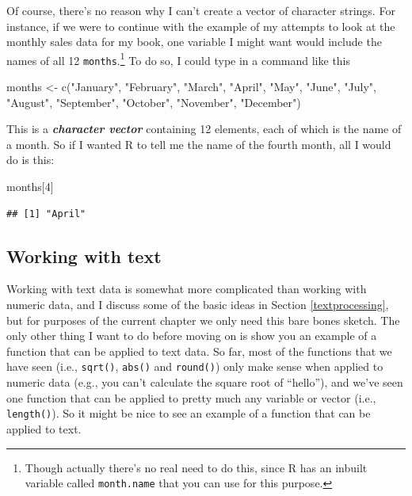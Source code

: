 \documentclass[
]{book}
\newenvironment{Shaded}{\begin{snugshade}}{\end{snugshade}}
\newcommand{\DecValTok}[1]{\textcolor[rgb]{0.00,0.00,0.81}{#1}}
\newcommand{\FunctionTok}[1]{\textcolor[rgb]{0.00,0.00,0.00}{#1}}
\newcommand{\NormalTok}[1]{#1}
\newcommand{\OtherTok}[1]{\textcolor[rgb]{0.56,0.35,0.01}{#1}}
\newcommand{\StringTok}[1]{\textcolor[rgb]{0.31,0.60,0.02}{#1}}
\begin{document}
Of course, there's no reason why I can't create a vector of character strings. For instance, if we were to continue with the example of my attempts to look at the monthly sales data for my book, one variable I might want would include the names of all 12 \texttt{months}.\footnote{Though actually there's no real need to do this, since R has an inbuilt variable called \texttt{month.name} that you can use for this purpose.} To do so, I could type in a command like this

\begin{Shaded}
\begin{Highlighting}[]
\NormalTok{months }\OtherTok{\textless{}{-}} \FunctionTok{c}\NormalTok{(}\StringTok{"January"}\NormalTok{, }\StringTok{"February"}\NormalTok{, }\StringTok{"March"}\NormalTok{, }\StringTok{"April"}\NormalTok{, }\StringTok{"May"}\NormalTok{, }\StringTok{"June"}\NormalTok{,}
            \StringTok{"July"}\NormalTok{, }\StringTok{"August"}\NormalTok{, }\StringTok{"September"}\NormalTok{, }\StringTok{"October"}\NormalTok{, }\StringTok{"November"}\NormalTok{, }
            \StringTok{"December"}\NormalTok{)}
\end{Highlighting}
\end{Shaded}

This is a \textbf{\emph{character vector}} containing 12 elements, each of which is the name of a month. So if I wanted R to tell me the name of the fourth month, all I would do is this:

\begin{Shaded}
\begin{Highlighting}[]
\NormalTok{months[}\DecValTok{4}\NormalTok{]}
\end{Highlighting}
\end{Shaded}

\begin{verbatim}
## [1] "April"
\end{verbatim}

\hypertarget{simpletext}{%
\subsection{Working with text}\label{simpletext}}

Working with text data is somewhat more complicated than working with numeric data, and I discuss some of the basic ideas in Section \ref{textprocessing}, but for purposes of the current chapter we only need this bare bones sketch. The only other thing I want to do before moving on is show you an example of a function that can be applied to text data. So far, most of the functions that we have seen (i.e., \texttt{sqrt()}, \texttt{abs()} and \texttt{round()}) only make sense when applied to numeric data (e.g., you can't calculate the square root of ``hello''), and we've seen one function that can be applied to pretty much any variable or vector (i.e., \texttt{length()}). So it might be nice to see an example of a function that can be applied to text.
\end{document}
